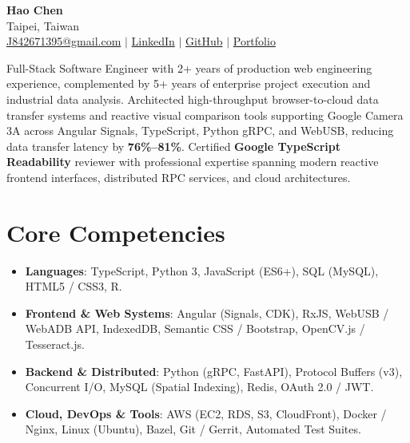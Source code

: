 \documentclass[10pt,a4paper]{article}
\begin{document}
\pagestyle{empty}

\begin{center}
    {\fontsize{22pt}{25pt}\bfseries\color{maindark} Hao Chen}\\[3pt]
    {\footnotesize\color{subgray} Taipei, Taiwan}\\[2pt]
    {\footnotesize\color{subgray} \href{mailto:J842671395@gmail.com}{J842671395@gmail.com} \hspace{0.5em}$|$\hspace{0.5em} \href{https://www.linkedin.com/in/hao-chen-804a8315a/}{LinkedIn} \hspace{0.5em}$|$\hspace{0.5em} \href{https://github.com/Haohaoscreamandrun}{GitHub} \hspace{0.5em}$|$\hspace{0.5em} \href{https://haohaoscreamandrun.github.io/backend-dev-resume/}{Portfolio}}
\end{center}

\vspace{2pt}

\noindent\small{\color{maindark} Full-Stack Software Engineer with 2+ years of production web engineering experience, complemented by 5+ years of enterprise project execution and industrial data analysis. Architected high-throughput browser-to-cloud data transfer systems and reactive visual comparison tools supporting Google Camera 3A across Angular Signals, TypeScript, Python gRPC, and WebUSB, reducing data transfer latency by \textbf{76\%--81\%}. Certified \textbf{Google TypeScript Readability} reviewer with professional expertise spanning modern reactive frontend interfaces, distributed RPC services, and cloud architectures.}

\section{Core Competencies}
\begin{itemize}
    \item \textbf{Languages}: TypeScript, Python 3, JavaScript (ES6+), SQL (MySQL), HTML5 / CSS3, R.
    \item \textbf{Frontend \& Web Systems}: Angular (Signals, CDK), RxJS, WebUSB / WebADB API, IndexedDB, Semantic CSS / Bootstrap, OpenCV.js / Tesseract.js.
    \item \textbf{Backend \& Distributed}: Python (gRPC, FastAPI), Protocol Buffers (v3), Concurrent I/O, MySQL (Spatial Indexing), Redis, OAuth 2.0 / JWT.
    \item \textbf{Cloud, DevOps \& Tools}: AWS (EC2, RDS, S3, CloudFront), Docker / Nginx, Linux (Ubuntu), Bazel, Git / Gerrit, Automated Test Suites.
\end{itemize}
\end{document}
